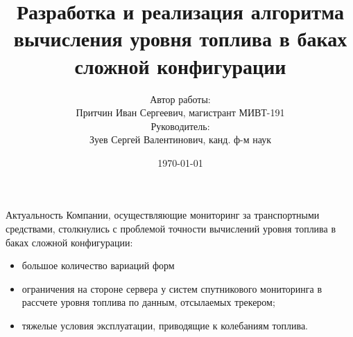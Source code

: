 \documentclass[usenames,dvipsnames,11pt]{beamer}
\title[БГТУ им. В.Г.Шухова]{Разработка и реализация алгоритма вычисления уровня топлива в баках сложной конфигурации}
\date[\today]{\small\today}
\author[Иван Притчин]{
		Автор работы:\\
		Притчин Иван Сергеевич, магистрант МИВТ-191 \\
		\vspace{0.3cm}
		Руководитель:\\
		Зуев Сергей Валентинович, канд. ф-м наук\\	
	}
\institute{Кафедра программного обеспечения ВТ и АС}
\begin{document}
\begin{frame}
  \titlepage
\end{frame}

\begin{frame}{Актуальность}
	Компании, осуществляющие мониторинг за транспортными средствами, столкнулись с проблемой точности вычислений уровня топлива в баках сложной конфигурации:
	\begin{itemize}
		\item большое количество вариаций форм
		\item ограничения на стороне сервера у систем спутникового мониторинга в рассчете уровня топлива по данным, отсылаемых трекером;
		\item тяжелые условия эксплуатации, приводящие к колебаниям топлива.
	\end{itemize}
\end{frame}
\end{document}
